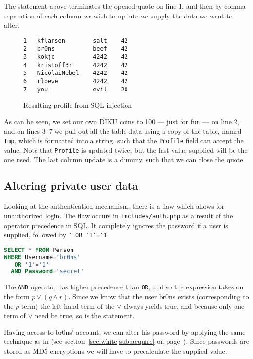 \documentclass[11pt,a4paper]{article}
\newcommand{\code}[1]{{\tt #1}}
\newcommand{\file}[1]{{\tt #1}}
\newcommand{\secref}[1]{(see section~\ref{#1} on page~\pageref{#1})}
\begin{document}
\begin{multicols}{2}
The statement above terminates the opened quote on line 1, and then by comma
separation of each column we wish to update we supply the data we want to
alter. 
\begin{figure}[H]
    \begin{lstlisting}
1   kflarsen        salt    42
2   br0ns           beef    42
3   kokjo           4242    42
4   kristoff3r      4242    42
5   NicolaiNebel    4242    42
6   rloewe          4242    42
7   you             evil    20
    \end{lstlisting}
    \caption{Resulting profile from SQL injection}
\end{figure}

As can be seen, we set our own DIKU coins to 100 --- just for fun ---
on line 2, and on lines 3--7 we pull out all the table data using a copy of
the table, named \code{Tmp}, which is formatted into a string, such that the
\code{Profile} field can accept the value. Note that \code{Profile} is updated
twice, but the last value supplied will be the one used. The last column
update is a dummy, such that we can close the quote.

\columnbreak

\subsection{Altering private user data}
Looking at the authentication mechanism, there is a flaw which allows for
unauthorized login. The flaw occurs in \file{includes/auth.php} as a result of
the operator precedence in SQL. It completely ignores the password if a user
is supplied, followed by \code{' OR '1'='1}.

\begin{lstlisting}[language=SQL]
SELECT * FROM Person
WHERE Username='br0ns'
   OR '1'='1'
  AND Password='secret'
\end{lstlisting}

The \code{AND} operator has higher precedence than \code{OR}, and so the
expression takes on the form $p \lor (q \land r)$. Since we know that the user
br0ns exists (corresponding to the $p$ term) the left-hand term of the $\lor$
always yields true, and because only one term of $\lor$ need be true, so is
the statement.

Having access to br0ns' account, we can alter his password by applying the
same technique as in \secref{sec:white|sub:acquire}. Since passwords are stored
as MD5 encryptions we will have to precalculate the supplied value.

\end{multicols}
\end{document}
